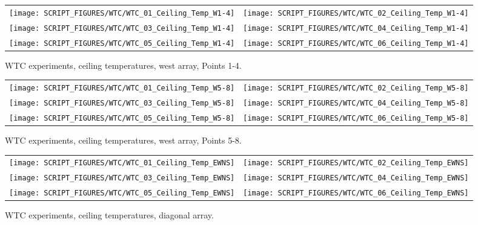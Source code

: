 \begin{figure}[p]
\begin{tabular*}{\textwidth}{l@{\extracolsep{\fill}}r}
\texttt{[image: SCRIPT\_FIGURES/WTC/WTC\_01\_Ceiling\_Temp\_W1-4]} &
\texttt{[image: SCRIPT\_FIGURES/WTC/WTC\_02\_Ceiling\_Temp\_W1-4]} \\
\texttt{[image: SCRIPT\_FIGURES/WTC/WTC\_03\_Ceiling\_Temp\_W1-4]} &
\texttt{[image: SCRIPT\_FIGURES/WTC/WTC\_04\_Ceiling\_Temp\_W1-4]} \\
\texttt{[image: SCRIPT\_FIGURES/WTC/WTC\_05\_Ceiling\_Temp\_W1-4]} &
\texttt{[image: SCRIPT\_FIGURES/WTC/WTC\_06\_Ceiling\_Temp\_W1-4]}
\end{tabular*}
\caption[WTC experiments, ceiling temperatures, west array, Points 1-4]{WTC experiments, ceiling temperatures, west array, Points 1-4.}
\label{NIST_WTC_Ceiling_W1-4}
\end{figure}

\begin{figure}[p]
\begin{tabular*}{\textwidth}{l@{\extracolsep{\fill}}r}
\texttt{[image: SCRIPT\_FIGURES/WTC/WTC\_01\_Ceiling\_Temp\_W5-8]} &
\texttt{[image: SCRIPT\_FIGURES/WTC/WTC\_02\_Ceiling\_Temp\_W5-8]} \\
\texttt{[image: SCRIPT\_FIGURES/WTC/WTC\_03\_Ceiling\_Temp\_W5-8]} &
\texttt{[image: SCRIPT\_FIGURES/WTC/WTC\_04\_Ceiling\_Temp\_W5-8]} \\
\texttt{[image: SCRIPT\_FIGURES/WTC/WTC\_05\_Ceiling\_Temp\_W5-8]} &
\texttt{[image: SCRIPT\_FIGURES/WTC/WTC\_06\_Ceiling\_Temp\_W5-8]}
\end{tabular*}
\caption[WTC experiments, ceiling temperatures, west array, Points 5-8]{WTC experiments, ceiling temperatures, west array, Points 5-8.}
\label{NIST_WTC_Ceiling_W5-8}
\end{figure}

\begin{figure}[p]
\begin{tabular*}{\textwidth}{l@{\extracolsep{\fill}}r}
\texttt{[image: SCRIPT\_FIGURES/WTC/WTC\_01\_Ceiling\_Temp\_EWNS]} &
\texttt{[image: SCRIPT\_FIGURES/WTC/WTC\_02\_Ceiling\_Temp\_EWNS]} \\
\texttt{[image: SCRIPT\_FIGURES/WTC/WTC\_03\_Ceiling\_Temp\_EWNS]} &
\texttt{[image: SCRIPT\_FIGURES/WTC/WTC\_04\_Ceiling\_Temp\_EWNS]} \\
\texttt{[image: SCRIPT\_FIGURES/WTC/WTC\_05\_Ceiling\_Temp\_EWNS]} &
\texttt{[image: SCRIPT\_FIGURES/WTC/WTC\_06\_Ceiling\_Temp\_EWNS]}
\end{tabular*}
\caption[WTC experiments, ceiling temperatures, diagonal array]{WTC experiments, ceiling temperatures, diagonal array.}
\label{NIST_WTC_Ceiling_EWNS}
\end{figure}

